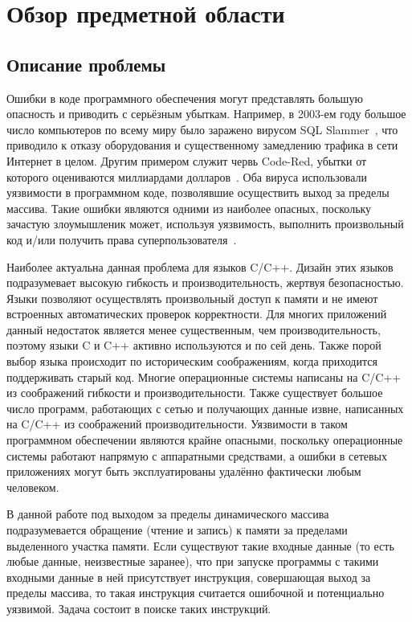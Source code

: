 \chapter{Обзор предметной области}

\section{Описание проблемы}

Ошибки в коде программного обеспечения могут представлять большую
опасность и приводить с серьёзным убыткам. Например, в 2003-ем году
большое число компьютеров по всему миру было заражено вирусом SQL
Slammer~\cite{moore2003spread}, что приводило к отказу оборудования и
существенному замедлению трафика в сети Интернет в целом. Другим
примером служит червь Code-Red, убытки от которого оцениваются
миллиардами долларов~\cite{moore2002code}. Оба вируса использовали
уязвимости в программном коде, позволявшие осуществить выход за
пределы массива. Такие ошибки являются одними из наиболее опасных,
поскольку зачастую злоумышленик может, используя уязвимость, выполнить
произвольный код и/или получить права
суперпользователя~\cite{onesmashing}.

Наиболее актуальна данная проблема для языков C/C++. Дизайн этих
языков подразумевает высокую гибкость и производительность, жертвуя
безопасностью. Языки позволяют осуществлять произвольный доступ к
памяти и не имеют встроенных автоматических проверок корректности. Для
многих приложений данный недостаток является менее существенным, чем
производительность, поэтому языки C и C++ активно используются и по
сей день. Также порой выбор языка происходит по историческим
соображениям, когда приходится поддерживать старый код. Многие
операционные системы написаны на C/C++ из соображений гибкости и
производительности. Также существует большое число программ,
работающих с сетью и получающих данные извне, написанных на C/C++ из
соображений производительности. Уязвимости в таком программном
обеспечении являются крайне опасными, поскольку операционные системы
работают напрямую с аппаратными средствами, а ошибки в сетевых
приложениях могут быть эксплуатированы удалённо фактически любым
человеком.

В данной работе под выходом за пределы динамического массива
подразумевается обращение (чтение и запись) к памяти за пределами
выделенного участка памяти. Если существуют такие входные данные (то
есть любые данные, неизвестные заранее), что при запуске программы с
такими входными данные в ней присутствует инструкция, совершающая
выход за пределы массива, то такая инструкция считается ошибочной и
потенциально уязвимой. Задача состоит в поиске таких инструкций.

